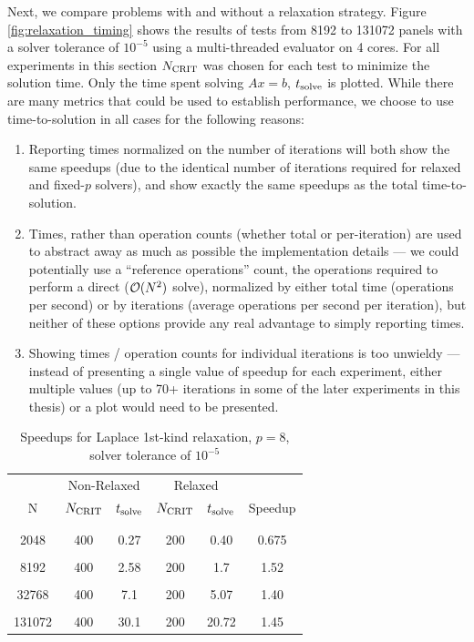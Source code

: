 Next, we compare problems with and without a relaxation strategy. Figure \ref{fig:relaxation_timing} shows the results of tests from 8192 to 131072 panels with a solver tolerance of $10^{-5}$ using a multi-threaded evaluator on 4 cores. For all experiments in this section $N_{\text{CRIT}}$ was chosen for each test to minimize the solution time. Only the time spent solving $Ax=b$, $t_{\text{solve}}$ is plotted. While there are many metrics that could be used to establish performance, we choose to use time-to-solution in all cases for the following reasons:

\begin{enumerate}
\item Reporting times normalized on the number of iterations will both show the same speedups (due to the identical number of iterations required for relaxed and fixed-$p$ solvers), and show exactly the same speedups as the total time-to-solution.

\item Times, rather than operation counts (whether total or per-iteration) are used to abstract away as much as possible the implementation details --- we could potentially use a ``reference operations'' count, the operations required to perform a direct ($\mathcal{O}(N^{2})$ solve), normalized by either total time (operations per second) or by iterations (average operations per second per iteration), but neither of these options provide any real advantage to simply reporting times.

\item Showing times / operation counts for individual iterations is too unwieldy --- instead of presenting a single value of speedup for each experiment, either multiple values (up to 70+ iterations in some of the later experiments in this thesis) or a plot would need to be presented.
\end{enumerate}

\begin{table}[h]
\begin{center}
\begin{tabular}{c|cc|cc|c}
  & \multicolumn{2}{c|}{Non-Relaxed} & \multicolumn{2}{c|}{Relaxed} & \\
  N & $N_{\text{CRIT}}$ & $t_{\text{solve}}$ & $N_{\text{CRIT}}$ & $t_{\text{solve}}$ & Speedup \\
   & & & & & \\ \hline
   & & & & & \\
  2048 & 400 & 0.27 & 200 & 0.40 & 0.675 \\
   & & & & & \\
  8192 & 400 & 2.58 & 200 & 1.7 & 1.52 \\
   & & & & & \\
  32768  & 400 & 7.1 & 200 & 5.07 & 1.40 \\
   & & & & & \\
  131072  & 400 & 30.1 & 200 & 20.72 & 1.45 \\
 
\end{tabular}
\end{center}
\caption{Speedups for Laplace 1st-kind relaxation, $p=8$, solver tolerance of $10^{-5}$}
\label{tab:laplace_1st_relaxation}
\end{table}%

